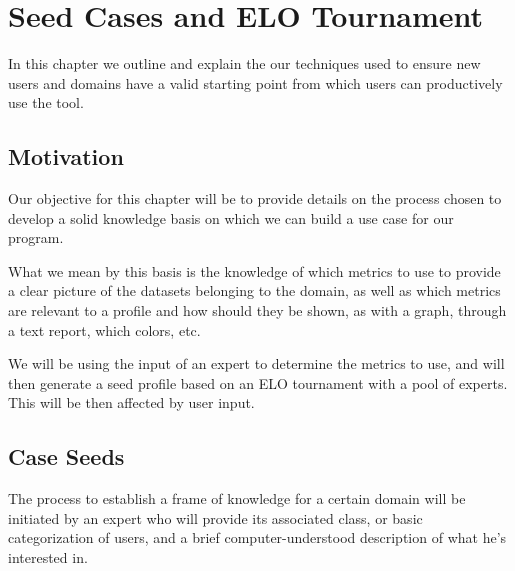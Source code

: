 %
%

\chapter{Seed Cases and ELO Tournament}

\begin{resumen}
In this chapter we outline and explain the our techniques used to ensure new users and domains have a valid starting point from which users can productively use the tool.
\end{resumen}

\linespread{1.6}

\section{Motivation}
\label{cap1:sec:motivation}

Our objective for this chapter will be to provide details on the process chosen to develop a solid knowledge basis on which we can build a use case for our program.

What we mean by this basis is the knowledge of which metrics to use to provide a clear picture of the datasets belonging to the domain, as well as which metrics are relevant to a profile and how should they be shown, as with a graph, through a text report, which colors, etc.

We will be using the input of an expert to determine the metrics to use, and will then generate a seed profile based on an ELO tournament with a pool of experts. This will be then affected by user input.

\section{Case Seeds}
\label{cap1:sec:metricseeds}

The process to establish a frame of knowledge for a certain domain will be initiated by an expert who will provide its associated class, 
or basic categorization of users, and a brief computer-understood description of what he's interested in.

